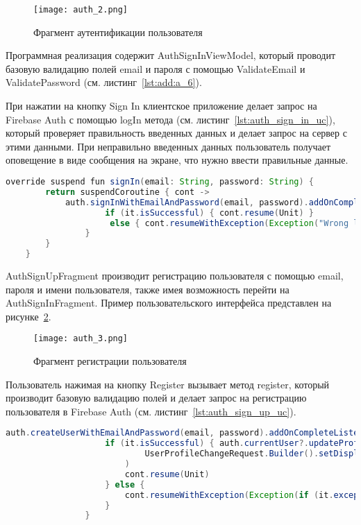 \begin{figure}[H]
 \centering
   \texttt{[image: auth\_2.png]} 
   \caption{Фрагмент аутентификации пользователя}
   \label{fig:arch:auth_2}
\end{figure}

Программная реализация содержит AuthSignInViewModel, который проводит базовую валидацию полей email и пароля с помощью ValidateEmail и ValidatePassword (см. листинг~\ref{lst:add:a_6}).

При нажатии на кнопку Sign In клиентское приложение делает запрос на Firebase Auth с помощью logIn метода (см. листинг~\ref{lst:auth_sign_in_uc}), который проверяет правильность введенных данных и делает запрос на сервер с этими данными. При неправильно введенных данных пользователь получает оповещение в виде сообщения на экране, что нужно ввести правильные данные.

\begin{lstlisting}[language=Java,label={lst:auth_sign_in_uc},caption={SignIn}]
    override suspend fun signIn(email: String, password: String) {
        return suspendCoroutine { cont ->
            auth.signInWithEmailAndPassword(email, password).addOnCompleteListener {
                    if (it.isSuccessful) { cont.resume(Unit) }
                     else { cont.resumeWithException(Exception("Wrong login or password")) }
                }
        }
    }
\end{lstlisting}

AuthSignUpFragment производит регистрацию пользователя с помощью email, пароля и имени пользователя, также имея возможность перейти на AuthSignInFragment. Пример пользовательского интерфейса представлен на рисунке~\ref{fig:arch:auth_3}.

\begin{figure}[H]
 \centering
   \texttt{[image: auth\_3.png]} 
   \caption{Фрагмент регистрации пользователя}
   \label{fig:arch:auth_3}
\end{figure}

Пользователь нажимая на кнопку Register вызывает метод register, который производит базовую валидацию полей и делает запрос на регистрацию пользователя в Firebase Auth (см. листинг~\ref{lst:auth_sign_up_uc}).
\begin{lstlisting}[language=Java,label={lst:auth_sign_up_uc},caption={SignUp}]
auth.createUserWithEmailAndPassword(email, password).addOnCompleteListener {
                    if (it.isSuccessful) { auth.currentUser?.updateProfile(
                            UserProfileChangeRequest.Builder().setDisplayName(name).build()
                        )
                        cont.resume(Unit)
                    } else {
                        cont.resumeWithException(Exception(if (it.exception != null) it.exception!!.message else "Wrong login or password"))
                    }
                }
\end{lstlisting}

